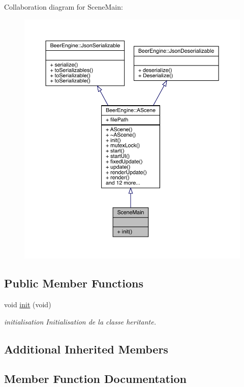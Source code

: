 Collaboration diagram for Scene\+Main\+:
\nopagebreak
\begin{figure}[H]
\begin{center}
\leavevmode
\includegraphics[width=350pt]{class_scene_main__coll__graph}
\end{center}
\end{figure}
\subsection*{Public Member Functions}
\begin{DoxyCompactItemize}
\item 
void \mbox{\hyperlink{class_scene_main_a4406dc5cf9807edcf360ba416de928e2}{init}} (void)
\begin{DoxyCompactList}\small\item\em initialisation Initialisation de la classe heritante. \end{DoxyCompactList}\end{DoxyCompactItemize}
\subsection*{Additional Inherited Members}


\subsection{Member Function Documentation}
\mbox{\label{class_scene_main_a4406dc5cf9807edcf360ba416de928e2}} 
